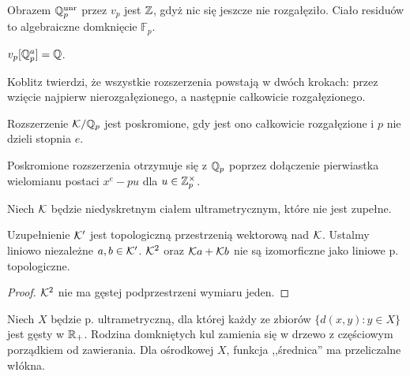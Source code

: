 \begin{fakt}
	Obrazem $\mathbb Q_p^{\textrm{unr}}$ przez $v_p$ jest $\mathbb Z$, gdyż nic się jeszcze nie rozgałęziło.
	Ciało residuów to algebraiczne domknięcie $\mathbb F_p$.
\end{fakt}

\begin{fakt}
	$v_p[\mathbb Q_p^a] = \mathbb Q$.
\end{fakt}

Koblitz twierdzi, że wszystkie rozszerzenia powstają w dwóch krokach: przez wzięcie najpierw nierozgałęzionego, a następnie całkowicie rozgałęzionego.

\begin{definicja}
	Rozszerzenie $\mathcal K / \mathbb Q_p$ jest poskromione, gdy jest ono całkowicie rozgałęzione i $p$ nie dzieli stopnia $e$.
\end{definicja}

\begin{fakt}
	Poskromione rozszerzenia otrzymuje się z $\mathbb Q_p$ poprzez dołączenie pierwiastka wielomianu postaci $x^e - pu$ dla $u \in \mathbb Z_p^\times$.
\end{fakt}

\begin{fakt} %
	Niech $\mathcal K$ będzie niedyskretnym ciałem ultrametrycznym, które nie jest zupełne.
	
	Uzupełnienie $\mathcal K'$ jest topologiczną przestrzenią wektorową nad $\mathcal K$.
	Ustalmy liniowo niezależne $a, b \in \mathcal K'$.
	$\mathcal K^2$ oraz $\mathcal K a + \mathcal K b$ nie są izomorficzne jako liniowe p. topologiczne.
\end{fakt}

\begin{proof}
	$\mathcal K^2$ nie ma gęstej podprzestrzeni wymiaru jeden.
\end{proof}

\begin{fakt} %
	Niech $X$ będzie p. ultrametryczną, dla której każdy ze zbiorów $\{d(x,y) : y \in X\}$ jest gęsty w $\mathbb R_+$.
	Rodzina domkniętych kul zamienia się w drzewo z częściowym porządkiem od zawierania.
	Dla ośrodkowej $X$, funkcja ,,średnica'' ma przeliczalne włókna.
\end{fakt}
